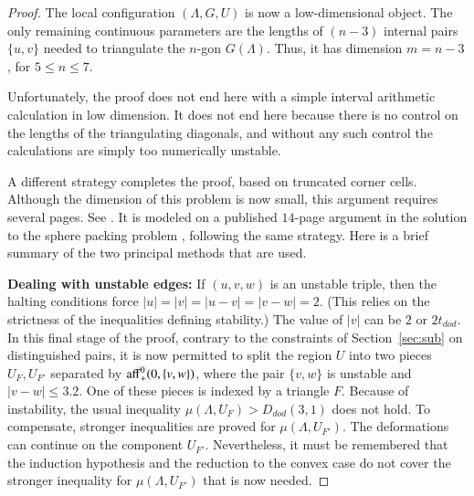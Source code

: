 \documentclass{article} %
\begin{document}
\begin{proof}
The local configuration $(\Lambda,G,U)$ is now a low-dimensional
object.  The only remaining continuous parameters are the lengths of
$(n-3)$ internal pairs $\{u,v\}$ needed to triangulate the
$n$-gon $G(\Lambda)$.  Thus, it has dimension $m=n-3$,
for $5\le n\le 7$.

Unfortunately, the proof does not end here with a simple interval
arithmetic calculation in low dimension.  It does not end
here because there is no control on the
lengths of the triangulating diagonals, and without any such
control the calculations are simply too numerically unstable.


A different strategy completes the proof, based on truncated
corner cells.  Although the dimension of this problem is now small,
this argument requires several pages.
See \cite[pp.30-38]{Hales:2002:Dodec}.  It is modeled on a published
$14$-page argument in the solution to the sphere packing problem
\cite[\S\S13.2-13.11]{Hales:2006:DCG}, following the same strategy.
Here is a brief summary of the two principal  methods that are used.

\textbf {Dealing with unstable edges:}  
If $(u,v,w)$ is an unstable triple, then the
halting conditions force $|u|=|v|=|u-v|=|v-w|=2$.  (This
relies on the strictness of the inequalities defining stability.)
The value of $|v|$ can be $2$ or $2t_{dod}$. In this final
stage of the proof, contrary to the constraints of Section~\ref{sec:sub}
on distinguished pairs,
it is now permitted to split the region $U$ into two pieces
$U_F,U_{F'}$ separated by ${\operatorname{aff}}_+^0(0,\{v,w\})$, where
the pair $\{v,w\}$ is unstable and $|v-w|\le 3.2$.  
One of these pieces is indexed
by a triangle $F$.  Because of instability, the usual inequality
$\mu(\Lambda,U_F)> D_{dod}(3,1)$ does not hold.  To compensate,
stronger inequalities are proved for $\mu(\Lambda,U_{F'})$.
The deformations can continue on the component $U_{F'}$. Nevertheless,
it must be remembered that the induction hypothesis and the 
reduction to the convex case do not cover the stronger 
inequality for $\mu(\Lambda,U_{F'})$ that is now needed.


\end{proof}
\end{document}
